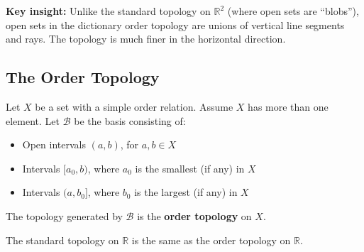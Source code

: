 \documentclass[11pt]{report}
\begin{document}
\begin{exbox}
\begin{center}
\end{center}

\textbf{Key insight:} Unlike the standard topology on $\mathbb{R}^2$ (where open sets are ``blobs''), open sets in the dictionary order topology are unions of vertical line segments and rays. The topology is much finer in the horizontal direction.
\end{exbox}

\subsection{The Order Topology}

\begin{defbox}
Let $X$ be a set with a simple order relation. Assume $X$ has more than one element. Let $\mathcal{B}$ be the basis consisting of:
\begin{itemize}
    \item Open intervals $(a, b)$, for $a, b \in X$
    \item Intervals $[a_0, b)$, where $a_0$ is the smallest (if any) in $X$
    \item Intervals $(a, b_0]$, where $b_0$ is the largest (if any) in $X$
\end{itemize}
The topology generated by $\mathcal{B}$ is the \textbf{order topology} on $X$.
\end{defbox}

\begin{exbox}
The standard topology on $\mathbb{R}$ is the same as the order topology on $\mathbb{R}$.
\end{exbox}
\end{document}
